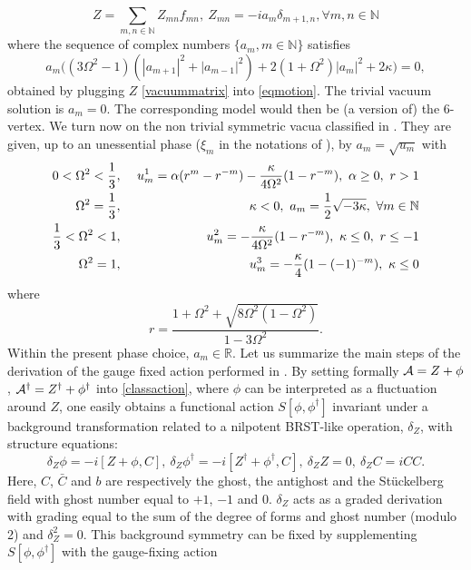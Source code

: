\documentclass[a4paper,11pt,twoside]{article}
\numberwithin{equation}{section}
\theoremstyle{nonumberplain}
\begin{document}
\begin{equation}
Z=\sum_{m,n\in\mathbb{N}}Z_{mn}f_{mn},\ Z_{mn}=-ia_{m}\delta_{m+1,n}, \forall m,n\in\mathbb{N}\label{vacuummatrix}
\end{equation}
where  the sequence of complex numbers $\{a_m, m\in\mathbb{N}\}$ satisfies
\begin{equation}
a_m\bigg((3\Omega^2-1)(|a_{m+1}|^2+|a_{m-1}|^2)+2(1+\Omega^2)|a_m|^2+2\kappa  \bigg)=0,\label{recursive}
\end{equation}
obtained by plugging $Z$ \eqref{vacuummatrix} into \eqref{eqmotion}. The trivial vacuum solution is $a_m=0$. The corresponding model would then be (a version of) the 6-vertex. We turn now on the non trivial symmetric vacua classified in \cite{GWW2}. They are given, up to an unessential phase ($\xi_m$ in the notations of \cite{GWW2}), by $a_m=\sqrt{u_m}$ with
\begin{eqnarray}
0<\Omega^2<\frac{1}{3}&,&\ u^1_m=\alpha(r^m-r^{-m})-\frac{\kappa}{4\Omega^2}(1-r^{-m}),\ \alpha\ge0,\ r>1\label{vac11}\\
\Omega^2={{1}\over{3}}&,&\ \kappa<0,\ a_m={{1}\over{2}}{\sqrt{ -3\kappa}},\ \forall m\in\mathbb{N}\label{sol1}\\
\frac{1}{3}<\Omega^2<1&,&\ u^2_m=-\frac{\kappa}{4\Omega^2}(1-r^{-m}),\ \kappa\le0,\ r\le-1\label{vac12}\\
\Omega^2=1&,&\ u^3_m=-\frac{\kappa}{4}(1-(-1)^{-m})\label{vac13},\ \kappa\le0
\end{eqnarray}
where
\begin{equation}
r=\frac{1+\Omega^2+\sqrt{8\Omega^2(1-\Omega^2)}}{1-3\Omega^2}\label{err}.
\end{equation}
Within the present phase choice, $a_m\in\mathbb{R}$. Let us summarize the main steps of the derivation of the gauge fixed action performed in \cite{MVW13}. By setting formally ${\cal{A}}=Z+\phi$, ${\cal{A}}^\dag=Z^\dag+\phi^\dag$ into \eqref{classaction}, where $\phi$ can be interpreted as a fluctuation around $Z$, one easily obtains a functional action $S[\phi,\phi^\dag]$ invariant under a background transformation related to a nilpotent BRST-like operation, $\delta_Z$, with structure equations:
\begin{equation}
\delta_Z\phi=-i[Z+\phi,C],\ \delta_Z\phi^\dag=-i[Z^\dag+\phi^\dag,C],\ \delta_ZZ=0,\ \delta_ZC=iCC\label{brsbackgrd}.
\end{equation}
Here, $C$, ${\bar{C}}$ and $b$ are respectively the ghost, the antighost and the St\"uckelberg field with ghost number equal to $+1$, $-1$ and $0$. $\delta_Z$ acts as a graded derivation with grading equal to the sum of the degree of forms and ghost number (modulo 2) and $\delta_Z^2=0$. This background symmetry can be fixed by supplementing $S[\phi,\phi^\dag]$ with the gauge-fixing action
\end{document}
